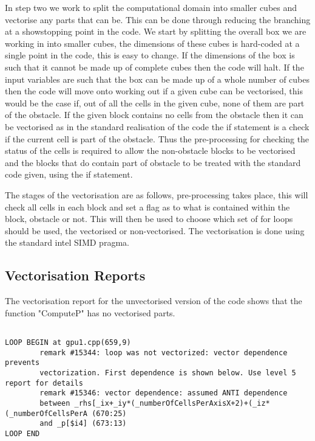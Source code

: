 \documentclass[paper=a4, fontsize=11pt]{scrartcl}
\numberwithin{equation}{section}		%
\numberwithin{figure}{section}			%
\numberwithin{table}{section}				%
\begin{document}
In step two we work to split the computational domain into smaller cubes and vectorise any parts that can be. This can be done through reducing the branching at a showstopping point in the code. We start by splitting the overall box we are working in into smaller cubes, the dimensions of these cubes is hard-coded at a single point in the code, this is easy to change. If the dimensions of the box is such that it cannot be made up of complete cubes then the code will halt. If the input variables are such that the box can be made up of a whole number of cubes then the code will move onto working out if a given cube can be vectorised, this would be the case if, out of all the cells in the given cube, none of them are part of the obstacle. If the given block contains no cells from the obstacle then it can be vectorised as in the standard realisation of the code the if statement is a check if the current cell is part of the obstacle. Thus the pre-processing for checking the status of the cells is required to allow the non-obstacle blocks to be vectorised and the blocks that do contain part of obstacle to be treated with the standard code given, using the if statement.

The stages of the vectorisation are as follows, pre-processing takes place, this will check all cells in each block and set a flag as to what is contained within the block, obstacle or not. This will then be used to choose which set of for loops should be used, the vectorised or non-vectorised. The vectorisation is done using the standard intel SIMD pragma.

\subsection{Vectorisation Reports}

The vectorisation report for the unvectorised version of the code shows that the function "ComputeP" has no vectorised parts.
\begin{lstlisting}

LOOP BEGIN at gpu1.cpp(659,9)
        remark #15344: loop was not vectorized: vector dependence prevents 
        vectorization. First dependence is shown below. Use level 5 report for details
        remark #15346: vector dependence: assumed ANTI dependence 
        between _rhs[_ix+_iy*(_numberOfCellsPerAxisX+2)+(_iz*(_numberOfCellsPerA (670:25) 
        and _p[$i4] (673:13)
LOOP END

\end{lstlisting}
\end{document}
